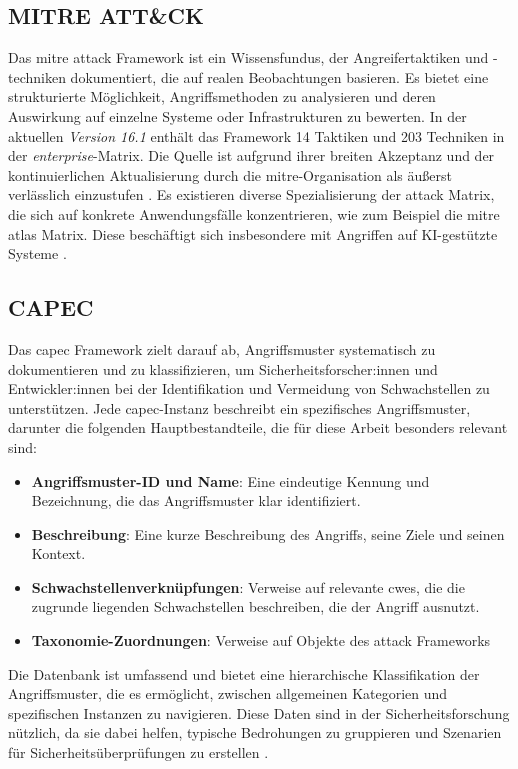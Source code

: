 \subsection{MITRE ATT\&CK}
Das \gls{mitre} \gls{attack} Framework ist ein Wissensfundus, der Angreifertaktiken und -techniken dokumentiert, die auf realen Beobachtungen basieren. Es bietet eine strukturierte Möglichkeit, Angriffsmethoden zu analysieren und deren Auswirkung auf einzelne Systeme oder Infrastrukturen zu bewerten. In der aktuellen \textit{Version 16.1} enthält das Framework 14 Taktiken und 203 Techniken in der \textit{enterprise}-Matrix. Die Quelle ist aufgrund ihrer breiten Akzeptanz und der kontinuierlichen Aktualisierung durch die \gls{mitre}-Organisation als äußerst verlässlich einzustufen \autocite{MITREATTCK}. Es existieren diverse Spezialisierung der \gls{attack} Matrix, die sich auf konkrete Anwendungsfälle konzentrieren, wie zum Beispiel die \gls{mitre} \gls{atlas} Matrix. Diese beschäftigt sich insbesondere mit Angriffen auf KI-gestützte Systeme \autocite{ATLASMatrixMITRE}.

\subsection{CAPEC}
\label{bg:capec}
Das \gls{capec} Framework zielt darauf ab, Angriffsmuster systematisch zu dokumentieren und zu klassifizieren, um Sicherheitsforscher:innen und Entwickler:innen bei der Identifikation und Vermeidung von Schwachstellen zu unterstützen. Jede \gls{capec}-Instanz beschreibt ein spezifisches Angriffsmuster, darunter die folgenden Hauptbestandteile, die für diese Arbeit besonders relevant sind:

\begin{itemize}
    \item \textbf{Angriffsmuster-ID und Name}: Eine eindeutige Kennung und Bezeichnung, die das Angriffsmuster klar identifiziert.
    \item \textbf{Beschreibung}: Eine kurze Beschreibung des Angriffs, seine Ziele und seinen Kontext.
    \item \textbf{Schwachstellenverknüpfungen}: Verweise auf relevante \glspl{cwe}, die die zugrunde liegenden Schwachstellen beschreiben, die der Angriff ausnutzt.
    \item \textbf{Taxonomie-Zuordnungen}: Verweise auf Objekte des \gls{attack} Frameworks
\end{itemize}

Die Datenbank ist umfassend und bietet eine hierarchische Klassifikation der Angriffsmuster, die es ermöglicht, zwischen allgemeinen Kategorien und spezifischen Instanzen zu navigieren. Diese Daten sind in der Sicherheitsforschung nützlich, da sie dabei helfen, typische Bedrohungen zu gruppieren und Szenarien für Sicherheitsüberprüfungen zu erstellen \autocite{CAPECWebsite}.


